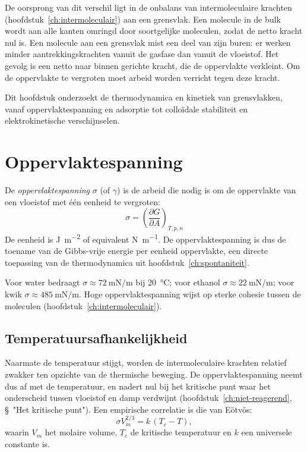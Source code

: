 De oorsprong van dit verschil ligt in de onbalans van intermoleculaire krachten (hoofdstuk~\ref{ch:intermoleculair}) aan een grensvlak. Een molecule in de bulk wordt aan alle kanten omringd door soortgelijke moleculen, zodat de netto kracht nul is. Een molecule aan een grensvlak mist een deel van zijn buren: er werken minder aantrekkingskrachten vanuit de gasfase dan vanuit de vloeistof. Het gevolg is een netto naar binnen gerichte kracht, die de oppervlakte verkleint. Om de oppervlakte te vergroten moet arbeid worden verricht tegen deze kracht.

Dit hoofdstuk onderzoekt de thermodynamica en kinetiek van grensvlakken, vanaf oppervlaktespanning en adsorptie tot collo\"idale stabiliteit en elektrokinetische verschijnselen.

\section{Oppervlaktespanning}
\label{sec:oppervlaktespanning}

De \emph{oppervlaktespanning} $\sigma$ (of $\gamma$) is de arbeid die nodig is om de oppervlakte van een vloeistof met \'e\'en eenheid te vergroten:
\begin{equation}
\boxed{\;\sigma = \left(\frac{\partial G}{\partial A}\right)_{T,p,n}\;}
\end{equation}
De eenheid is \si{\joule\per\metre\squared} of equivalent \si{\newton\per\metre}. De oppervlaktespanning is dus de toename van de Gibbs-vrije energie per eenheid oppervlakte, een directe toepassing van de thermodynamica uit hoofdstuk~\ref{ch:spontaniteit}.

Voor water bedraagt $\sigma \approx \SI{72}{\milli\newton\per\metre}$ bij \SI{20}{\celsius}; voor ethanol $\sigma \approx \SI{22}{\milli\newton\per\metre}$; voor kwik $\sigma \approx \SI{485}{\milli\newton\per\metre}$. Hoge oppervlaktespanning wijst op sterke cohesie tussen de moleculen (hoofdstuk~\ref{ch:intermoleculair}).

\subsection{Temperatuursafhankelijkheid}

Naarmate de temperatuur stijgt, worden de intermoleculaire krachten relatief zwakker ten opzichte van de thermische beweging. De oppervlaktespanning neemt dus af met de temperatuur, en nadert nul bij het kritische punt waar het onderscheid tussen vloeistof en damp verdwijnt (hoofdstuk~\ref{ch:niet-reagerend}, \S~"Het kritische punt"). Een empirische correlatie is die van E\"otv\"os:
\begin{equation}
\sigma V_m^{2/3} = k\,(T_c - T),
\end{equation}
waarin $V_m$ het molaire volume, $T_c$ de kritische temperatuur en $k$ een universele constante is.

